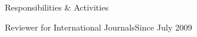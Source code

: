 \documentclass{resume} %
\begin{document}
\begin{rSection}{Responsibilities \& Activities}
\begin{rSubsection}{Reviewer for International Journals}{Since July 2009}{}{}

\end{rSubsection}
\end{rSection}
\end{document}

